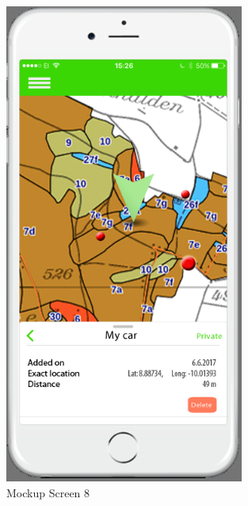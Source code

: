 \begin{figure}[H]
\centering
    \includegraphics[width=0.7\textwidth]{mockup1-8}
    \caption{Mockup Screen 8}
    \label{fig:mesh8}
\end{figure}

